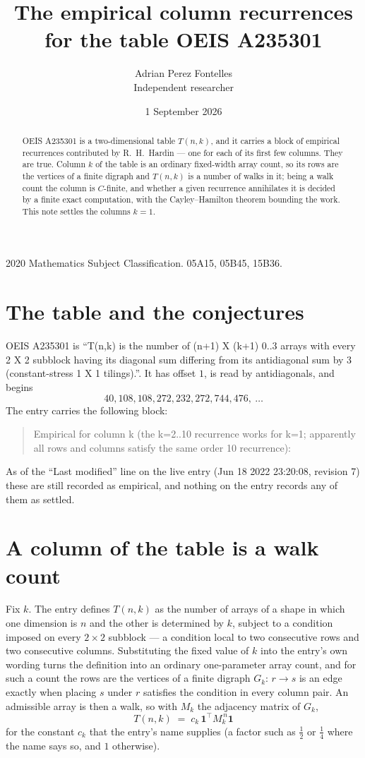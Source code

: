 \documentclass[11pt,a4paper]{article}
\title{The empirical column recurrences for the table OEIS A235301}
\author{Adrian Perez Fontelles\\ \small Independent researcher}
\date{1 September 2026}
\theoremstyle{plain}
\theoremstyle{definition}
\begin{document}
\maketitle

\begin{abstract}
OEIS A235301 is a two-dimensional table $T(n,k)$, and it carries a block of empirical
recurrences contributed by R.~H.~Hardin --- one for each of its first few columns. They are
true. Column $k$ of the table is an ordinary fixed-width array count, so its rows are the
vertices of a finite digraph and $T(n,k)$ is a number of walks in it; being a walk count the
column is $C$-finite, and whether a given recurrence annihilates it is decided by a finite
exact computation, with the Cayley--Hamilton theorem bounding the work. This note settles the
columns $k=1$.
\end{abstract}

\noindent\small 2020 Mathematics Subject Classification. 05A15, 05B45, 15B36.\normalsize

\section{The table and the conjectures}

OEIS A235301 is ``T(n,k) is the number of (n+1) X (k+1) 0..3 arrays with every 2 X 2 subblock having its diagonal sum differing from its antidiagonal sum by 3 (constant-stress 1 X 1 tilings).''. It has offset $1$, is
read by antidiagonals, and begins
\[
40, 108, 108, 272, 232, 272, 744, 476,\ \dots
\]
The entry carries the following block:
\begin{quote}\small
Empirical for column k (the k=2..10 recurrence works for k=1; apparently all rows and columns satisfy the same order 10 recurrence):\\
\end{quote}
As of the ``Last modified'' line on the live entry (Jun 18 2022 23:20:08, revision 7) these are still
recorded as empirical, and nothing on the entry records any of them as settled.

\section{A column of the table is a walk count}

Fix $k$. The entry defines $T(n,k)$ as the number of arrays of a shape in which one dimension
is $n$ and the other is determined by $k$, subject to a condition imposed on every
$2\times2$ subblock --- a condition local to two consecutive rows and two consecutive columns.
Substituting the fixed value of $k$ into the entry's own wording turns the definition into an
ordinary one-parameter array count, and for such a count the rows are the vertices of a finite
digraph $G_k$: $r\to s$ is an edge exactly when placing $s$ under $r$ satisfies the condition
in every column pair. An admissible array is then a walk, so with $M_k$ the adjacency matrix
of $G_k$,
\[
T(n,k)\;=\;c_k\,\mathbf{1}^{\!\top}M_k^{\,n}\mathbf{1}
\]
for the constant $c_k$ that the entry's name supplies (a factor such as $\tfrac12$ or
$\tfrac14$ where the name says so, and $1$ otherwise).
\end{document}
